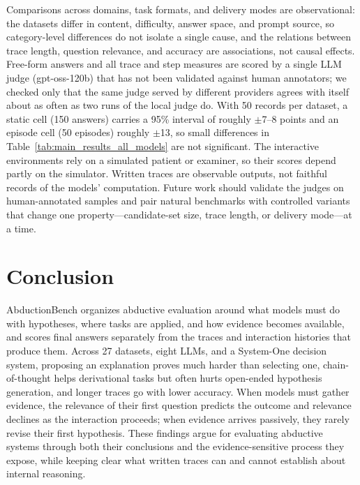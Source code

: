 Comparisons across domains, task formats, and delivery modes are observational: the datasets differ in content, difficulty, answer space, and prompt source, so category-level differences do not isolate a single cause, and the relations between trace length, question relevance, and accuracy are associations, not causal effects. Free-form answers and all trace and step measures are scored by a single LLM judge (gpt-oss-120b) that has not been validated against human annotators; we checked only that the same judge served by different providers agrees with itself about as often as two runs of the local judge do. With 50 records per dataset, a static cell (150 answers) carries a 95\% interval of roughly $\pm$7--8 points and an episode cell (50 episodes) roughly $\pm$13, so small differences in Table~\ref{tab:main_results_all_models} are not significant. The interactive environments rely on a simulated patient or examiner, so their scores depend partly on the simulator. Written traces are observable outputs, not faithful records of the models' computation. Future work should validate the judges on human-annotated samples and pair natural benchmarks with controlled variants that change one property---candidate-set size, trace length, or delivery mode---at a time.


\section{Conclusion}
\label{sec:conclusion}

AbductionBench organizes abductive evaluation around what models must do with hypotheses, where tasks are applied, and how evidence becomes available, and scores final answers separately from the traces and interaction histories that produce them. Across 27 datasets, eight LLMs, and a System-One decision system, proposing an explanation proves much harder than selecting one, chain-of-thought helps derivational tasks but often hurts open-ended hypothesis generation, and longer traces go with lower accuracy. When models must gather evidence, the relevance of their first question predicts the outcome and relevance declines as the interaction proceeds; when evidence arrives passively, they rarely revise their first hypothesis. These findings argue for evaluating abductive systems through both their conclusions and the evidence-sensitive process they expose, while keeping clear what written traces can and cannot establish about internal reasoning.


